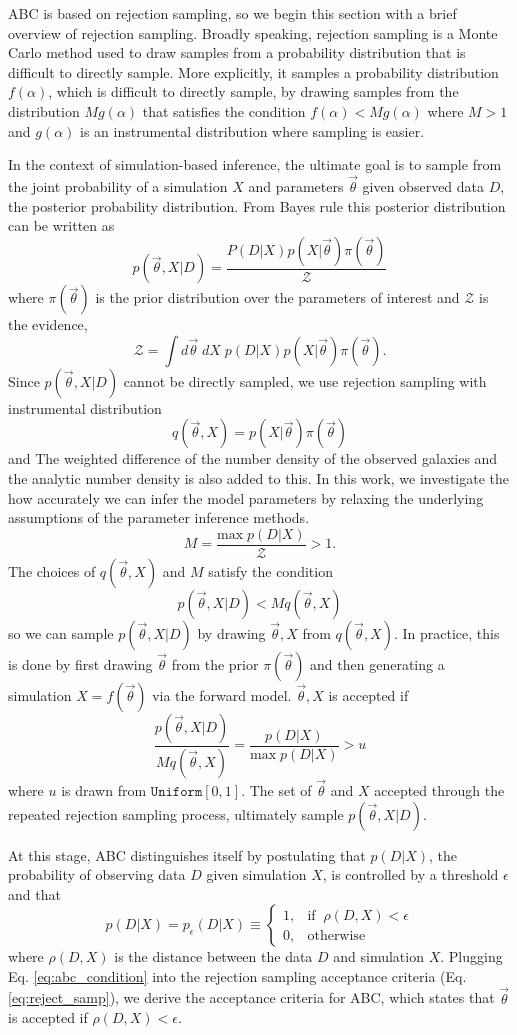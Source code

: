 \documentclass[12pt, preprint]{aastex}
\newcommand{\beq}{\begin{equation}}
\newcommand{\eeq}{\end{equation}}
\newcommand{\pars}{\vec{\theta}}
\begin{document}
ABC is based on rejection sampling, so we begin this section with a brief overview of 
rejection sampling. Broadly speaking, rejection sampling is a Monte Carlo method 
used to draw samples from a probability distribution that is difficult 
to directly sample. More explicitly, it samples a probability distribution 
$f(\alpha)$, which is difficult to directly sample, by drawing samples 
from the distribution $M g(\alpha)$ that satisfies the condition 
$f(\alpha) < M g(\alpha)$ where $M > 1$ and $g(\alpha)$ is an 
instrumental distribution where sampling is easier.

In the context of simulation-based inference, 
the ultimate goal is to sample from the joint probability of a
simulation $X$ and parameters $\pars$ given observed data $D$, the
posterior probability distribution. From Bayes rule this posterior 
distribution can be written as 
\beq
p(\pars, X | D) = \frac{P(D|X)p(X|\pars)\pi(\pars)}{\mathcal{Z}}
\eeq
where $\pi(\pars)$ is the prior distribution over the parameters of 
interest and $\mathcal{Z}$ is the evidence, 
\beq
\mathcal{Z} = \int d\pars \; dX\; p(D|X) p(X|\pars) \pi(\pars). 
\eeq
Since $p(\pars, X | D)$ cannot be directly sampled, we use rejection 
sampling with instrumental distribution 
\beq
q(\pars, X) = p(X|\pars) \pi(\pars)
\eeq
and  The weighted difference of the number density of the observed galaxies and the analytic number density is also added to this. In this work, we investigate the how accurately we can infer the model parameters by relaxing the underlying assumptions of the parameter inference methods.
\beq
M = \frac{\mathrm{max}\; p(D|X)}{\mathcal{Z}} > 1.
\eeq
The choices of $q(\pars, X)$ and $M$ satisfy the condition 
\beq
p(\pars, X | D) < M q(\pars, X)
\eeq
so we can sample $p(\pars, X | D)$ by drawing ${\pars, X}$ from $q(\pars, X)$.
In practice, this is done 
by first drawing $\pars$ from the prior $\pi(\pars)$ and then generating a 
simulation $X = f(\pars)$ via the forward model. ${\pars, X}$ 
is accepted if
\beq \label{eq:reject_samp}
\frac{p(\pars, X | D)}{M q(\pars, X)} = \frac{p(D|X)}{\mathrm{max}\;p(D|X)} > u 
\eeq
where $u$ is drawn from $\mathtt{Uniform}[0,1]$. The set of $\pars$ and $X$ 
accepted through the repeated rejection sampling process, ultimately sample 
$p(\pars, X |D)$.  

At this stage, ABC distinguishes itself by postulating that $p(D|X)$, 
the probability of observing data $D$ given simulation $X$, is controlled 
by a threshold $\epsilon$ and that 
\beq \label{eq:abc_condition}
p(D|X)= p_\epsilon(D|X)\equiv 
\begin{cases}
    1,		& \text{if}\;\; \rho(D, X) < \epsilon\\
    0,      & \text{otherwise}
\end{cases}
\eeq
where $\rho(D, X)$ is the distance between the data $D$ and simulation $X$. 
Plugging Eq. \ref{eq:abc_condition} into the 
rejection sampling acceptance criteria (Eq. \ref{eq:reject_samp}), we 
derive the acceptance criteria for ABC, which states that $\pars$ is accepted 
if $\rho(D, X) < \epsilon$. 
\end{document}
